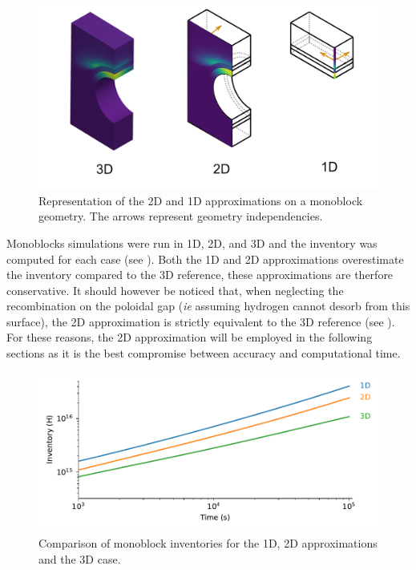\begin{figure}
    \centering
    \includegraphics[width=\linewidth]{Figures/Chapter3/monoblocks/dimension_approximation.png}
    \caption{Representation of the 2D and 1D approximations on a monoblock geometry. The arrows represent geometry independencies.}
\end{figure}

Monoblocks simulations were run in 1D, 2D, and 3D and the inventory was computed for each case (see ).
Both the 1D and 2D approximations overestimate the inventory compared to the 3D reference, these approximations are therfore conservative.
It should however be noticed that, when neglecting the recombination on the poloidal gap (\textit{ie} assuming hydrogen cannot desorb from this surface), the 2D approximation is strictly equivalent to the 3D reference (see ).
For these reasons, the 2D approximation will be employed in the following sections as it is the best compromise between accuracy and computational time.

\begin{figure}
    \centering
    \includegraphics[width=\linewidth]{Figures/Chapter3/monoblocks/3D_monoblocks/comparison_inventory_1d_2d_3d.pdf}
    \caption{Comparison of monoblock inventories for the 1D, 2D approximations and the 3D case.}
\end{figure}

